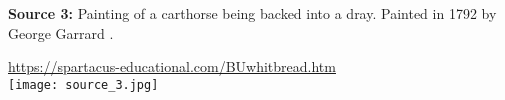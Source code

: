 \textbf{Source 3:} Painting of a carthorse being backed into a dray.  Painted in 1792 by George Garrard \cite{garra92}.

\url{https://spartacus-educational.com/BUwhitbread.htm} \\

\texttt{[image: source\_3.jpg]} \\